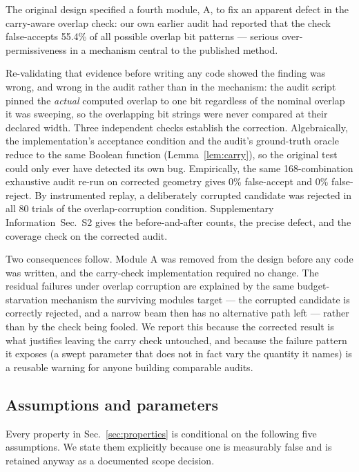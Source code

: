 \documentclass[preprint,11pt]{elsarticle}
\newcommand{\SI}{Supplementary Information}
\newcommand{\SIaudit}{\SI{}~Sec.~S2}
\begin{document}
The original design specified a fourth module, A, to fix an apparent
defect in the carry-aware overlap check: our own earlier audit had
reported that the check false-accepts 55.4\% of all possible overlap bit
patterns --- serious over-permissiveness in a mechanism central to the
published method.

Re-validating that evidence before writing any code showed the finding
was wrong, and wrong in the audit rather than in the mechanism: the audit
script pinned the \emph{actual} computed overlap to one bit regardless of
the nominal overlap it was sweeping, so the overlapping bit strings were
never compared at their declared width. Three independent checks
establish the correction. Algebraically, the implementation's acceptance
condition and the audit's ground-truth oracle reduce to the same Boolean
function (Lemma~\ref{lem:carry}), so the original test could only ever
have detected its own bug. Empirically, the same 168-combination
exhaustive audit re-run on corrected geometry gives 0\% false-accept and
0\% false-reject. By instrumented replay, a deliberately corrupted
candidate was rejected in all 80 trials of the overlap-corruption
condition. \SIaudit{} gives the before-and-after counts, the precise
defect, and the coverage check on the corrected audit.

Two consequences follow. Module A was removed from the design before any
code was written, and the carry-check implementation required no change.
The residual failures under overlap corruption are explained by the same
budget-starvation mechanism the surviving modules target --- the corrupted
candidate is correctly rejected, and a narrow beam then has no
alternative path left --- rather than by the check being fooled. We report
this because the corrected result is what justifies leaving the carry
check untouched, and because the failure pattern it exposes (a swept
parameter that does not in fact vary the quantity it names) is a reusable
warning for anyone building comparable audits.

\subsection{Assumptions and parameters}
\label{sec:assumptions}

Every property in Sec.~\ref{sec:properties} is conditional on the
following five assumptions. We state them explicitly because one is
measurably false and is retained anyway as a documented scope decision.
\end{document}
